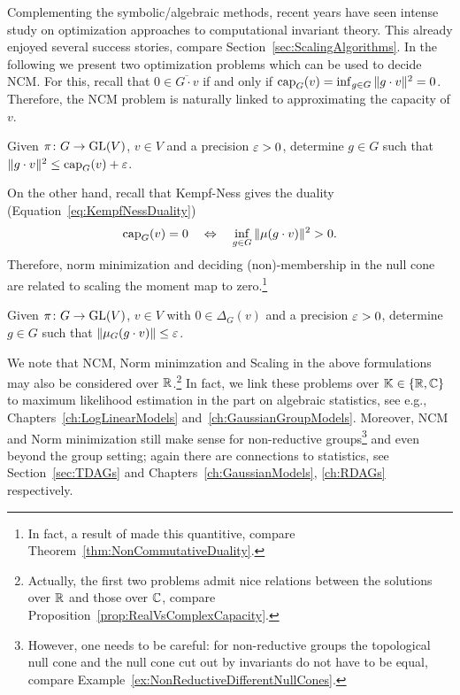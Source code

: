 Complementing the symbolic/algebraic methods, recent years have seen intense study on optimization approaches to computational invariant theory. This already enjoyed several success stories, compare Section~\ref{sec:ScalingAlgorithms}. In the following we present two optimization problems which can be used to decide NCM. For this, recall that $0 \in \overline{G \cdot v}$ if and only if $\operatorname{cap}_G(v) = \inf_{g \in G} \| g \cdot v\|^2 = 0$. Therefore, the NCM problem is naturally linked to approximating the capacity of $v$.

\begin{compprob} \label{comp:NormMinim} 
	Given $\pi \colon G \to \operatorname{GL}(V)$, $v \in V$ and a precision $\varepsilon > 0$, determine $g \in G$ such that $\| g \cdot v \|^2 \leq \operatorname{cap}_G(v) + \varepsilon$.
\end{compprob}

On the other hand, recall that Kempf-Ness gives the duality (Equation~\eqref{eq:KempfNessDuality})
	\[ \operatorname{cap}_G(v) = 0 \quad \Leftrightarrow \quad \inf_{g \in G} \| \mu(g \cdot v) \|^2 > 0 . \]
Therefore, norm minimization and deciding (non)-membership in the null cone are related to scaling the moment map to zero.\footnote{In fact, a result of \cite{GradflowArXiv} made this quantitive, compare Theorem~\ref{thm:NonCommutativeDuality}.}

\begin{compprob}[Scaling] \label{comp:Scaling} 
	Given $\pi \colon G \to \operatorname{GL}(V)$, $v \in V$ with $0 \in \Delta_G(v)$ and a precision $\varepsilon > 0$, determine $g \in G$ such that $\| \mu_G(g \cdot v) \| \leq \varepsilon$.
\end{compprob}

\begin{remark}\label{rem:CompProblemsOverRR}
	We note that NCM, Norm minimzation and Scaling in the above formulations may also be considered over $\mathbb R$.\footnote{Actually, the first two problems admit nice relations between the solutions over $\mathbb R$ and those over $\mathbb C$, compare Proposition~\ref{prop:RealVsComplexCapacity}.}
	In fact, we link these problems over $\mathbb K \in \{\mathbb R, \mathbb C\}$ to maximum likelihood estimation in the part on algebraic statistics, see e.g., Chapters~\ref{ch:LogLinearModels} and~\ref{ch:GaussianGroupModels}. Moreover, NCM and Norm minimization still make sense for non-reductive groups\footnote{However, one needs to be careful: for non-reductive groups the topological null cone and the null cone cut out by invariants do not have to be equal, compare Example~\ref{ex:NonReductiveDifferentNullCones}.}
	and even beyond the group setting; again there are connections to statistics, see Section~\ref{sec:TDAGs} and Chapters~\ref{ch:GaussianModels}, \ref{ch:RDAGs} respectively.
	\hfill\remSymbol
\end{remark}

